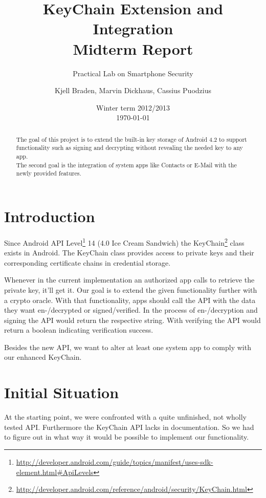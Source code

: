 \documentclass[a4paper]{scrartcl}
\title{KeyChain Extension and Integration\\
	Midterm Report}
\subtitle{Practical Lab on Smartphone Security}
\author{Kjell Braden, Marvin Dickhaus, Cassius Puodzius}
\date{Winter term 2012/2013\\\today}
\begin{document}
\maketitle

\begin{abstract}
	The goal of this project is to extend the built-in key storage of Android 4.2 to support functionality such as signing and decrypting without revealing the needed key to any app.\\
	The second goal is the integration of system apps like Contacts or E-Mail with the newly provided features.
\end{abstract}

\tableofcontents
\pagebreak[4]

\section{Introduction}
	Since Android API Level\footnote{\url{http://developer.android.com/guide/topics/manifest/uses-sdk-element.html\#ApiLevels}} 14 (4.0 Ice Cream Sandwich) the KeyChain\footnote{\url{http://developer.android.com/reference/android/security/KeyChain.html}} class exists in Android. The KeyChain class provides access to private keys and their corresponding certificate chains in credential storage.

	Whenever in the current implementation an authorized app calls to retrieve the private key, it'll get it. Our goal is to extend the given functionality further with a crypto oracle. With that functionality, apps should call the API with the data they want en-/decrypted or signed/verified. In the process of en-/decryption and signing the API would return the respective string. With verifying the API would return a boolean indicating verification success.

	Besides the new API, we want to alter at least one system app to comply with our enhanced KeyChain.

\section{Initial Situation}
	At the starting point, we were confronted with a quite unfinished, not wholly tested API. Furthermore the KeyChain API lacks in documentation. So we had to figure out in what way it would be possible to implement our functionality.
\end{document}
